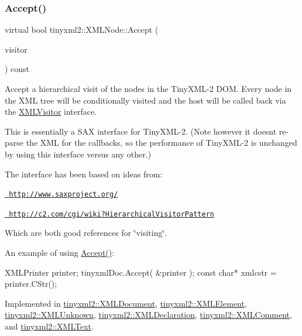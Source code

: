 \subsubsection{\texorpdfstring{Accept()}{Accept()}}
{\footnotesize\ttfamily virtual bool tinyxml2\+::\+X\+M\+L\+Node\+::\+Accept (\begin{DoxyParamCaption}\item[{\mbox{\hyperlink{classtinyxml2_1_1XMLVisitor}{X\+M\+L\+Visitor}} $\ast$}]{visitor }\end{DoxyParamCaption}) const\hspace{0.3cm}{\ttfamily [pure virtual]}}

Accept a hierarchical visit of the nodes in the Tiny\+X\+M\+L-\/2 D\+OM. Every node in the X\+ML tree will be conditionally visited and the host will be called back via the \mbox{\hyperlink{classtinyxml2_1_1XMLVisitor}{X\+M\+L\+Visitor}} interface.

This is essentially a S\+AX interface for Tiny\+X\+M\+L-\/2. (Note however it doesn\textquotesingle{}t re-\/parse the X\+ML for the callbacks, so the performance of Tiny\+X\+M\+L-\/2 is unchanged by using this interface versus any other.)

The interface has been based on ideas from\+:


\begin{DoxyItemize}
\item \href{http://www.saxproject.org/}{\texttt{ http\+://www.\+saxproject.\+org/}}
\item \href{http://c2.com/cgi/wiki?HierarchicalVisitorPattern}{\texttt{ http\+://c2.\+com/cgi/wiki?\+Hierarchical\+Visitor\+Pattern}}
\end{DoxyItemize}

Which are both good references for \char`\"{}visiting\char`\"{}.

An example of using \mbox{\hyperlink{classtinyxml2_1_1XMLNode_a81e66df0a44c67a7af17f3b77a152785}{Accept()}}\+: \begin{DoxyVerb}XMLPrinter printer;
tinyxmlDoc.Accept( &printer );
const char* xmlcstr = printer.CStr();
\end{DoxyVerb}
 

Implemented in \mbox{\hyperlink{classtinyxml2_1_1XMLDocument_a9efa54f7ecb37c17ab1fa2b3078ccca1}{tinyxml2\+::\+X\+M\+L\+Document}}, \mbox{\hyperlink{classtinyxml2_1_1XMLElement_a3ea8a40e788fb9ad876c28a32932c6d5}{tinyxml2\+::\+X\+M\+L\+Element}}, \mbox{\hyperlink{classtinyxml2_1_1XMLUnknown_a70983aa1b1cff3d3aa6d4d0a80e5ee48}{tinyxml2\+::\+X\+M\+L\+Unknown}}, \mbox{\hyperlink{classtinyxml2_1_1XMLDeclaration_a5f376019fb34752eb248548f42f32045}{tinyxml2\+::\+X\+M\+L\+Declaration}}, \mbox{\hyperlink{classtinyxml2_1_1XMLComment_a4a33dc32fae0285b03f9cfcb3e43e122}{tinyxml2\+::\+X\+M\+L\+Comment}}, and \mbox{\hyperlink{classtinyxml2_1_1XMLText_a1b2c1448f1a21299d0a7913f18b55206}{tinyxml2\+::\+X\+M\+L\+Text}}.


